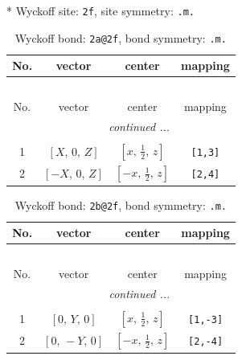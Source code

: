 \documentclass[fleqn,8pt]{jsarticle}
\begin{document}
* Wyckoff site: {\tt 2f}, site symmetry: {\tt .m.}
\renewcommand{\arraystretch}{1.2}
\begin{longtable}{cccc}
\caption{Wyckoff bond: {\tt 2a@2f}, bond symmetry: {\tt .m.}}
 \\
 \hline \hline
No. & vector & center & mapping \\ \hline \endfirsthead

\multicolumn{3}{l}{\tablename\ \thetable{}} \\
 \hline \hline
No. & vector & center & mapping \\ \hline \endhead

 \hline \hline
\multicolumn{3}{r}{\footnotesize\it continued ...} \\ \endfoot

 \hline \hline
\multicolumn{3}{r}{} \\ \endlastfoot

1 & $\left[ X,\, 0,\, Z \right]$ & $\left[ x,\, \frac{1}{2},\, z \right]$ & {\tt [1,3]} \\ \hline
2 & $\left[ - X,\, 0,\, Z \right]$ & $\left[ - x,\, \frac{1}{2},\, z \right]$ & {\tt [2,4]} \\
\end{longtable}
\renewcommand{\arraystretch}{1.2}
\begin{longtable}{cccc}
\caption{Wyckoff bond: {\tt 2b@2f}, bond symmetry: {\tt .m.}}
 \\
 \hline \hline
No. & vector & center & mapping \\ \hline \endfirsthead

\multicolumn{3}{l}{\tablename\ \thetable{}} \\
 \hline \hline
No. & vector & center & mapping \\ \hline \endhead

 \hline \hline
\multicolumn{3}{r}{\footnotesize\it continued ...} \\ \endfoot

 \hline \hline
\multicolumn{3}{r}{} \\ \endlastfoot

1 & $\left[ 0,\, Y,\, 0 \right]$ & $\left[ x,\, \frac{1}{2},\, z \right]$ & {\tt [1,-3]} \\ \hline
2 & $\left[ 0,\, - Y,\, 0 \right]$ & $\left[ - x,\, \frac{1}{2},\, z \right]$ & {\tt [2,-4]} \\
\end{longtable}
\renewcommand{\arraystretch}{1.2}
\end{document}
